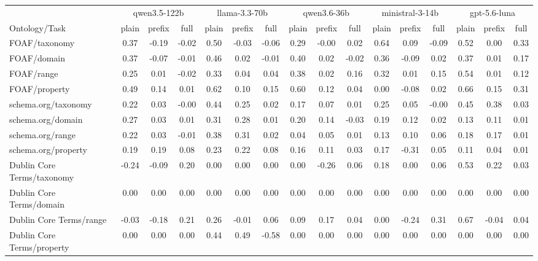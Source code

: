 \begin{tabular}{lccccccccccccccc}
\toprule
 & \multicolumn{3}{c}{qwen3.5-122b} & \multicolumn{3}{c}{llama-3.3-70b} & \multicolumn{3}{c}{qwen3.6-36b} & \multicolumn{3}{c}{ministral-3-14b} & \multicolumn{3}{c}{gpt-5.6-luna} \\
\cmidrule(lr){2-4} \cmidrule(lr){5-7} \cmidrule(lr){8-10} \cmidrule(lr){11-13} \cmidrule(lr){14-16}
Ontology/Task & plain & prefix & full & plain & prefix & full & plain & prefix & full & plain & prefix & full & plain & prefix & full \\
\midrule
FOAF/taxonomy & 0.37 & -0.19 & -0.02 & 0.50 & -0.03 & -0.06 & 0.29 & -0.00 & 0.02 & 0.64 & 0.09 & -0.09 & 0.52 & 0.00 & 0.33 \\
FOAF/domain & 0.37 & -0.07 & -0.01 & 0.46 & 0.02 & -0.01 & 0.40 & 0.02 & -0.02 & 0.36 & -0.09 & 0.02 & 0.37 & 0.01 & 0.17 \\
FOAF/range & 0.25 & 0.01 & -0.02 & 0.33 & 0.04 & 0.04 & 0.38 & 0.02 & 0.16 & 0.32 & 0.01 & 0.15 & 0.54 & 0.01 & 0.12 \\
FOAF/property & 0.49 & 0.14 & 0.01 & 0.62 & 0.10 & 0.15 & 0.60 & 0.12 & 0.04 & 0.00 & -0.08 & 0.02 & 0.66 & 0.15 & 0.31 \\
schema.org/taxonomy & 0.22 & 0.03 & -0.00 & 0.44 & 0.25 & 0.02 & 0.17 & 0.07 & 0.01 & 0.25 & 0.05 & -0.00 & 0.45 & 0.38 & 0.03 \\
schema.org/domain & 0.27 & 0.03 & 0.01 & 0.31 & 0.28 & 0.01 & 0.20 & 0.14 & -0.03 & 0.19 & 0.12 & 0.02 & 0.13 & 0.11 & 0.01 \\
schema.org/range & 0.22 & 0.03 & -0.01 & 0.38 & 0.31 & 0.02 & 0.04 & 0.05 & 0.01 & 0.13 & 0.10 & 0.06 & 0.18 & 0.17 & 0.01 \\
schema.org/property & 0.19 & 0.19 & 0.08 & 0.23 & 0.22 & 0.08 & 0.16 & 0.11 & 0.03 & 0.17 & -0.31 & 0.05 & 0.11 & 0.04 & 0.01 \\
Dublin Core Terms/taxonomy & -0.24 & -0.09 & 0.20 & 0.00 & 0.00 & 0.00 & 0.00 & -0.26 & 0.06 & 0.18 & 0.00 & 0.06 & 0.53 & 0.22 & 0.03 \\
Dublin Core Terms/domain & 0.00 & 0.00 & 0.00 & 0.00 & 0.00 & 0.00 & 0.00 & 0.00 & 0.00 & 0.00 & 0.00 & 0.00 & 0.00 & 0.00 & 0.00 \\
Dublin Core Terms/range & -0.03 & -0.18 & 0.21 & 0.26 & -0.01 & 0.06 & 0.09 & 0.17 & 0.04 & 0.00 & -0.24 & 0.31 & 0.67 & -0.04 & 0.04 \\
Dublin Core Terms/property & 0.00 & 0.00 & 0.00 & 0.44 & 0.49 & -0.58 & 0.00 & 0.00 & 0.00 & 0.00 & 0.00 & 0.00 & 0.00 & 0.00 & 0.00 \\

\end{tabular}
